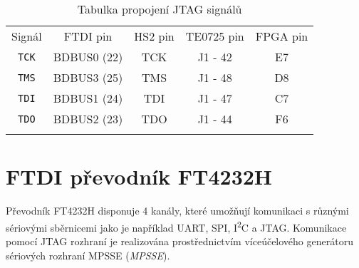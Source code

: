 \begin{table}[H]
  \caption{Tabulka propojení \acs{JTAG} signálů}
  \begin{center}
  	\small
	  \begin{tabular}{!{\vrule width 1.2pt}c|c|c|c|c!{\vrule width 1.2pt}}
	    Signál & FTDI pin & HS2 pin & TE0725 pin & FPGA pin\\
			\texttt{\acs{TCK}} & BDBUS0 (22) & \acs{TCK} & J1 - 42 & E7\\
			\hline
			\texttt{\acs{TMS}} & BDBUS3 (25) & \acs{TMS} & J1 - 48 & D8\\
			\hline
			\texttt{\acs{TDI}} & BDBUS1 (24) & \acs{TDI} & J1 - 47 & C7\\
			\hline
			\texttt{\acs{TDO}} & BDBUS2 (23) & \acs{TDO} & J1 - 44 & F6\\
			\hline
		\end{tabular}
  \end{center}
	\label{tab:jtag_dev_board}
\end{table}

\section{FTDI převodník FT4232H}
Převodník FT4232H disponuje 4 kanály, které umožňují komunikaci s různými sériovými sběrnicemi jako je například UART, SPI, I\textsuperscript{2}C a \acs{JTAG}. Komunikace pomocí \acs{JTAG} rozhraní je realizována prostřednictvím víceúčelového generátoru sériových rozhraní \acs{MPSSE} (\textit{\acl{MPSSE}}). 
 